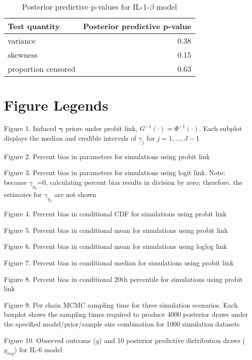 \documentclass[
]{article}
\begin{document}
\begin{table}[!h]

\caption{\label{tab:ppptab2}Posterior predictive p-values for IL-1-$\beta$ model}
\centering
\begin{tabular}[t]{lr}
\toprule
Test quantity & Posterior predictive p-value\\
\midrule
variance & 0.38\\
skewness & 0.15\\
proportion censored & 0.63\\
\bottomrule
\end{tabular}
\end{table}

\newpage

\hypertarget{figure-legends}{%
\section*{Figure Legends}\label{figure-legends}}

Figure 1. Induced \(\boldsymbol{\gamma}\) priors under probit link, \(G^{-1}(\cdot)=\Phi^{-1}(\cdot)\). Each subplot displays the median and credible intervals of \(\gamma_j\) for \(j=1,\ldots,J-1\)

Figure 2. Percent bias in parameters for simulations using probit link

Figure 3. Percent bias in parameters for simulations using logit link. Note: because \(\gamma_{y_2}\)=0, calculating percent bias results in division by zero; therefore, the estimates for \(\gamma_{y_2}\) are not shown

Figure 4. Percent bias in conditional CDF for simulations using probit link

Figure 5. Percent bias in conditional mean for simulations using probit link

Figure 6. Percent bias in conditional mean for simulations using loglog link

Figure 7. Percent bias in conditional median for simulations using probit link

Figure 8. Percent bias in conditional 20th percentile for simulations using probit link

Figure 9. Per chain MCMC sampling time for three simulation scenarios. Each boxplot shows the sampling times required to produce 4000 posterior draws under the specified model/prior/sample size combination for 1000 simulation datasets

Figure 10. Observed outcome (\(y\)) and 10 posterior predictive distribution draws (\(y_{rep}\)) for IL-6 model
\end{document}
